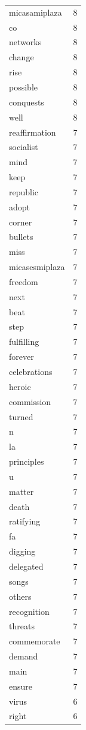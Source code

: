 \begin{tabular}{lr}
micasamiplaza & 8 \\
co & 8 \\
networks & 8 \\
change & 8 \\
rise & 8 \\
possible & 8 \\
conquests & 8 \\
well & 8 \\
reaffirmation & 7 \\
socialist & 7 \\
mind & 7 \\
keep & 7 \\
republic & 7 \\
adopt & 7 \\
corner & 7 \\
bullets & 7 \\
miss & 7 \\
micasesmiplaza & 7 \\
freedom & 7 \\
next & 7 \\
beat & 7 \\
step & 7 \\
fulfilling & 7 \\
forever & 7 \\
celebrations & 7 \\
heroic & 7 \\
commission & 7 \\
turned & 7 \\
n & 7 \\
la & 7 \\
principles & 7 \\
u & 7 \\
matter & 7 \\
death & 7 \\
ratifying & 7 \\
fa & 7 \\
digging & 7 \\
delegated & 7 \\
songs & 7 \\
others & 7 \\
recognition & 7 \\
threats & 7 \\
commemorate & 7 \\
demand & 7 \\
main & 7 \\
ensure & 7 \\
virus & 6 \\
right & 6 \\

\end{tabular}
